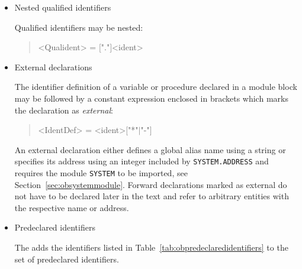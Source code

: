 \begin{itemize}

\item Nested qualified identifiers

Qualified identifiers may be nested:

\begin{quote}\begin{grammar}
<Qualident> = $[$"."$]$<ident> \par
\end{grammar}\end{quote}

\item External declarations

The identifier definition of a variable or procedure declared in a module block may be followed by a constant expression enclosed in brackets which marks the declaration as \emph{external}:

\begin{quote}\begin{grammar}
<IdentDef> = <ident>$[$"*"$\mid$"-"$]$  \par
\end{grammar}\end{quote}

An external declaration either defines a global alias name using a string or specifies its address using an integer included by \texttt{SYSTEM.AD\-DRESS} and requires the module \texttt{SYSTEM} to be imported, see Section~\ref{sec:obsystemmodule}.
Forward declarations marked as external do not have to be declared later in the text and refer to arbitrary entities with the respective name or address.

\item Predeclared identifiers

The \ecs{} adds the identifiers listed in Table~\ref{tab:obpredeclaredidentifiers} to the set of predeclared identifiers.


\end{itemize}
